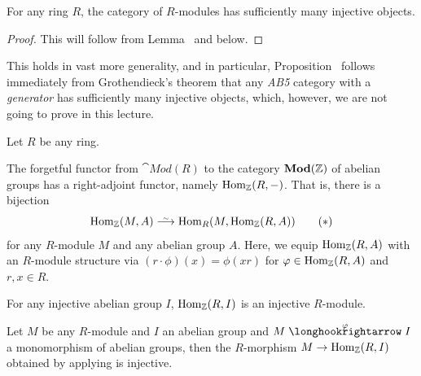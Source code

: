 \documentclass[a4paper,parskip=half,numbers=enddot, DIV=12]{scrreprt}
\begin{document}
\begin{prop}[a.k.a. ``Satz 2'']
	For any ring $R$, the category of $R$-modules has sufficiently many injective objects.
\end{prop}
\begin{proof}
	This will follow from Lemma~ and  below.
\end{proof}
\begin{rem*}
	This holds in vast more generality, and in particular, Proposition~ follows immediately from Grothendieck's theorem that any \emph{AB5} category with a \emph{generator} has sufficiently many injective objects, which, however, we are not going to prove in this lecture.
\end{rem*}
\begin{lem}
	Let $R$ be any ring.
	\begin{alphanumerate}
		\item The forgetful functor from $\cat{Mod}(R)$ to the category $\cat{Mod}(\IZ)$ of abelian groups has a right-adjoint functor, namely $\operatorname{Hom}_{\mathbb{Z}}(R,-)$. That is, there is a bijection
		\begin{align}\lbl{eq:ForgetHomAdjunction}
			\Hom_\IZ(M,A)\isomorphism\Hom_R(M,\Hom_\IZ(R,A))\tag{$*$}
		\end{align}
		for any $R$-module $M$ and any abelian group $A$. Here, we equip $\operatorname{Hom}_{\mathbb{Z}}(R,A)$ with an $R$-module structure via $(r\cdot\phi)(x)=\phi(xr)$ for $\varphi\in\operatorname{Hom}_{\mathbb{Z}}(R,A)$ and $r,x\in R$.
		\item For any injective abelian group $I$, $\operatorname{Hom}_{\mathbb{Z}}(R,I)$ is an injective $R$-module.
		\item Let $M$ be any $R$-module and $I$ an abelian group and $M\monomorphism[\phi]I$ a monomorphism of abelian groups, then the $R$-morphism $M\morphism\Hom_\IZ(R,I)$ obtained by applying  is injective.
	\end{alphanumerate}
\end{lem}
\end{document}
